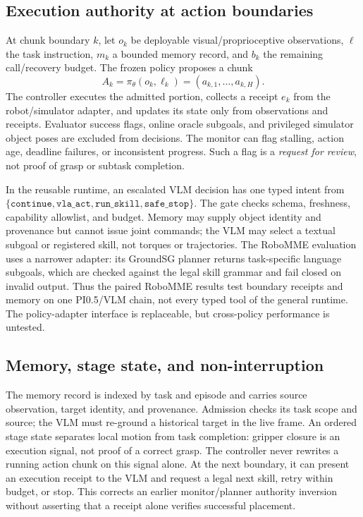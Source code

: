 \documentclass[letterpaper,10pt,conference]{ieeeconf}
\newcommand{\policy}{\pi_{\theta}}
\begin{document}
\subsection{Execution authority at action boundaries}
At chunk boundary $k$, let $o_k$ be deployable visual/proprioceptive observations, $\ell$ the task instruction, $m_k$ a bounded memory record, and $b_k$ the remaining call/recovery budget. The frozen policy proposes a chunk
\begin{equation}
 A_k=\policy(o_k,\ell_k)=(a_{k,1},\ldots,a_{k,H}).
\end{equation}
The controller executes the admitted portion, collects a receipt $e_k$ from the robot/simulator adapter, and updates its state only from observations and receipts. Evaluator success flags, online oracle subgoals, and privileged simulator object poses are excluded from decisions. The monitor can flag stalling, action age, deadline failures, or inconsistent progress. Such a flag is a \emph{request for review}, not proof of grasp or subtask completion.

In the reusable runtime, an escalated VLM decision has one typed intent from $\{\texttt{continue},\texttt{vla\_act},\texttt{run\_skill},\texttt{safe\_stop}\}$. The gate checks schema, freshness, capability allowlist, and budget. Memory may supply object identity and provenance but cannot issue joint commands; the VLM may select a textual subgoal or registered skill, not torques or trajectories. The RoboMME evaluation uses a narrower adapter: its GroundSG planner returns task-specific language subgoals, which are checked against the legal skill grammar and fail closed on invalid output. Thus the paired RoboMME results test boundary receipts and memory on one PI0.5/VLM chain, not every typed tool of the general runtime. The policy-adapter interface is replaceable, but cross-policy performance is untested.

\subsection{Memory, stage state, and non-interruption}
The memory record is indexed by task and episode and carries source observation, target identity, and provenance. Admission checks its task scope and source; the VLM must re-ground a historical target in the live frame. An ordered stage state separates local motion from task completion: gripper closure is an execution signal, not proof of a correct grasp. The controller never rewrites a running action chunk on this signal alone. At the next boundary, it can present an execution receipt to the VLM and request a legal next skill, retry within budget, or stop. This corrects an earlier monitor/planner authority inversion without asserting that a receipt alone verifies successful placement.
\end{document}
